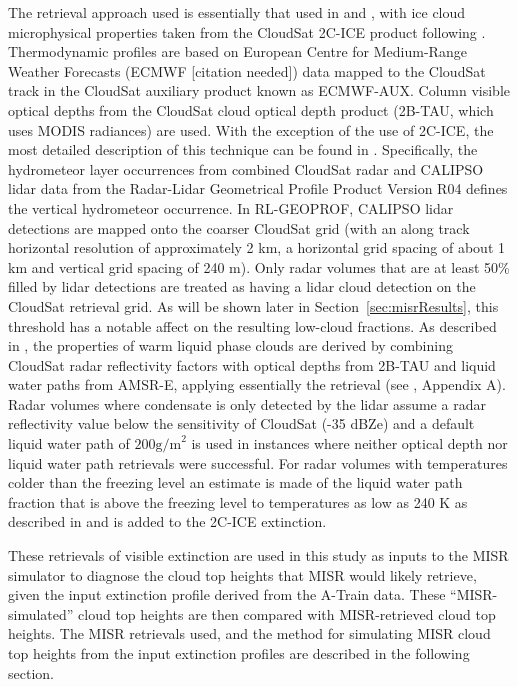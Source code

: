 The retrieval approach used is essentially that used in
\citet{mace_and_wrenn_2013} and \citet{berry_and_mace_2014}, with ice
cloud microphysical properties taken from the CloudSat 2C-ICE product
\citep{deng_et_al_2010, deng_et_al_2013} following
\citet{berry_and_mace_2014}. Thermodynamic profiles are based on
European Centre for Medium-Range Weather Forecasts (ECMWF {[}citation
needed{]}) data mapped to the CloudSat track in the CloudSat auxiliary
product known as ECMWF-AUX. Column visible optical depths from the
CloudSat cloud optical depth product (2B-TAU, which uses MODIS
radiances) are used. With the exception of the use of 2C-ICE, the most
detailed description of this technique can be found in
\citet{mace_2010}. Specifically, the hydrometeor layer occurrences from
combined CloudSat radar and CALIPSO lidar data from the Radar-Lidar
Geometrical Profile Product
\citep[RL-GEOPROF;][]{mace_et_al_2009, mace_and_zhang_2014} Version R04
defines the vertical hydrometeor occurrence. In RL-GEOPROF, CALIPSO
lidar detections are mapped onto the coarser CloudSat grid (with an
along track horizontal resolution of approximately 2 km, a horizontal
grid spacing of about 1 km and vertical grid spacing of 240 m). Only
radar volumes that are at least 50\% filled by lidar detections are
treated as having a lidar cloud detection on the CloudSat retrieval
grid. As will be shown later in Section~\ref{sec:misrResults}, this
threshold has a notable affect on the resulting low-cloud fractions. As
described in \citet{mace_2010}, the properties of warm liquid phase
clouds are derived by combining CloudSat radar reflectivity factors with
optical depths from 2B-TAU and liquid water paths from AMSR-E, applying
essentially the \citet{dong_and_mace_2003} retrieval (see
\citet{mace_2010}, Appendix A). Radar volumes where condensate is only
detected by the lidar assume a radar reflectivity value below the
sensitivity of CloudSat (-35 dBZe) and a default liquid water path of
\(200 \textrm{g/m}^2\) is used in instances where neither optical depth
nor liquid water path retrievals were successful. For radar volumes with
temperatures colder than the freezing level an estimate is made of the
liquid water path fraction that is above the freezing level to
temperatures as low as 240 K as described in \citet{mace_et_al_2006} and
is added to the 2C-ICE extinction.

These retrievals of visible extinction are used in this study as inputs
to the MISR simulator to diagnose the cloud top heights that MISR would
likely retrieve, given the input extinction profile derived from the
A-Train data. These ``MISR-simulated'' cloud top heights are then
compared with MISR-retrieved cloud top heights. The MISR retrievals
used, and the method for simulating MISR cloud top heights from the
input extinction profiles are described in the following section.

